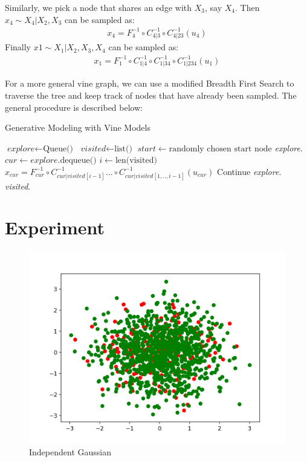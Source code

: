 \documentclass{article}
\begin{document}
Similarly, we pick a node that shares an edge with $X_3$, say $X_4$. Then $x_4 \sim X_4|X_2,X_3$ can be sampled as:
\begin{align}
x_4= F_4^{-1}\circ C_{4|3}^{-1}\circ C_{4|23}^{-1}(u_4)
\end{align}
Finally $x1 \sim X_1|X_2,X_3,X_4$ can be sampled as:
\begin{align}
x_1= F_1^{-1}\circ C_{1|4}^{-1}\circ C_{1|34}^{-1}\circ C_{1|234}^{-1}(u_1)
\end{align}

For a more general vine graph, we can use a modified Breadth First Search to traverse the tree and keep track of nodes that have already been sampled. The general procedure is described below:
\begin{algorithm}
\caption{Generative Modeling with Vine Models}\label{euclid}
\begin{algorithmic}[1]
\State $\textit{explore} \gets \text{Queue()}$
\State $\textit{visited} \gets \text{list()}$
\State $start \gets \text{randomly chosen start node}$
\State \textit{explore}.
\State $cur \gets \textit{explore.}\text{dequeue()}$
\State $i \gets \text{len(visited)}$
\State $x_{cur} = F_{cur}^{-1}\circ C_{cur|visited[i-1]}^{-1}...\circ C_{cur|visited[1,..,i-1]}^{-1}(u_{cur})$
                \State Continue
        \Else
        		\State \textit{explore}.
        \EndIf
\State \textit{visited}.
\EndFor
\EndWhile
\EndProcedure
\end{algorithmic}
\end{algorithm}

\section{Experiment}
\begin{figure}
    \centering
    \includegraphics[scale=0.6]{ind_gaussian.png}
    \caption{Independent Gaussian}
    \label{fig:my_label}
\end{figure}
\end{document}
